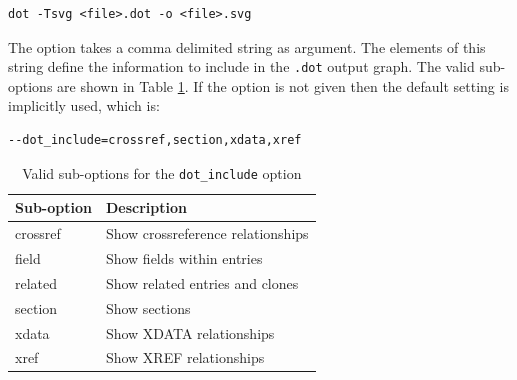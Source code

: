 \documentclass{ltxdockit}
\begin{document}
\begin{verbatim}
dot -Tsvg <file>.dot -o <file>.svg
\end{verbatim}

\noindent The  option takes a comma delimited string as
argument. The elements of this string define the information to include in
the \verb+.dot+ output graph. The valid sub-options are shown in Table
\ref{tab:graphopts}. If the  option is not given
then the default setting is implicitly used, which is:

\begin{verbatim}
--dot_include=crossref,section,xdata,xref
\end{verbatim}

\begin{table}
\begin{center}
\small
\begin{tabular}{ll}
\toprule
Sub-option & Description\\
\midrule
crossref & Show crossreference relationships\\
field    & Show fields within entries\\
related  & Show related entries and clones\\
section  & Show sections\\
xdata    & Show XDATA relationships\\
xref     & Show XREF relationships\\
\bottomrule
\end{tabular}
\end{center}
\caption{Valid sub-options for the \texttt{dot\_include} option}
\label{tab:graphopts}
\end{table}
\end{document}
